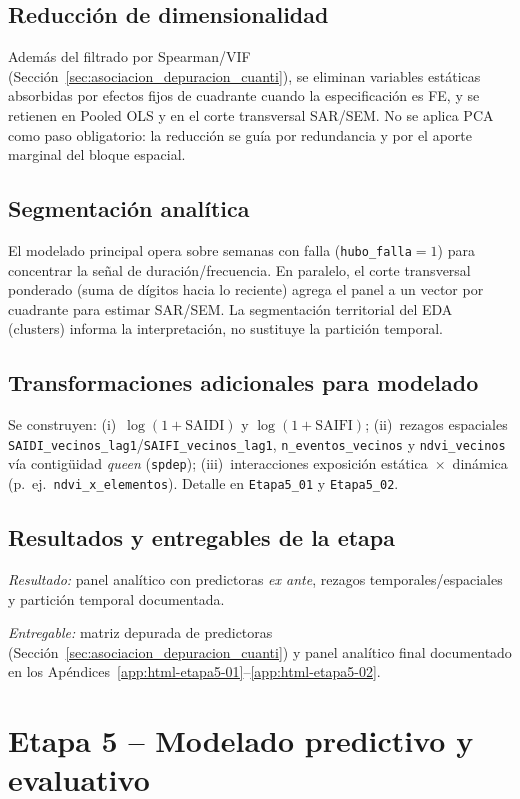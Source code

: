 \subsection{Reducción de dimensionalidad}
Además del filtrado por Spearman/VIF (Sección~\ref{sec:asociacion_depuracion_cuanti}), se eliminan variables estáticas absorbidas por efectos fijos de cuadrante cuando la especificación es FE, y se retienen en Pooled OLS y en el corte transversal SAR/SEM. No se aplica PCA como paso obligatorio: la reducción se guía por redundancia y por el aporte marginal del bloque espacial.

\subsection{Segmentación analítica}
El modelado principal opera sobre semanas con falla (\texttt{hubo\_falla}$=1$) para concentrar la señal de duración/frecuencia. En paralelo, el corte transversal ponderado (suma de dígitos hacia lo reciente) agrega el panel a un vector por cuadrante para estimar SAR/SEM. La segmentación territorial del EDA (clusters) informa la interpretación, no sustituye la partición temporal.

\subsection{Transformaciones adicionales para modelado}
Se construyen: (i)~$\log(1+\mathrm{SAIDI})$ y $\log(1+\mathrm{SAIFI})$; (ii)~rezagos espaciales \texttt{SAIDI\_vecinos\_lag1}/\texttt{SAIFI\_vecinos\_lag1}, \texttt{n\_eventos\_vecinos} y \texttt{ndvi\_vecinos} vía contigüidad \emph{queen} (\texttt{spdep}); (iii)~interacciones exposición estática~$\times$~dinámica (p.~ej.~\texttt{ndvi\_x\_elementos}). Detalle en \texttt{Etapa5\_01} y \texttt{Etapa5\_02}.

\subsection{Resultados y entregables de la etapa}
\textit{Resultado:} panel analítico con predictoras \emph{ex ante}, rezagos temporales/espaciales y partición temporal documentada.

\textit{Entregable:} matriz depurada de predictoras (Sección~\ref{sec:asociacion_depuracion_cuanti}) y panel analítico final documentado en los Apéndices~\ref{app:html-etapa5-01}--\ref{app:html-etapa5-02}.

\section{Etapa 5 – Modelado predictivo y evaluativo}
\label{sec:metodología-etapa5}

